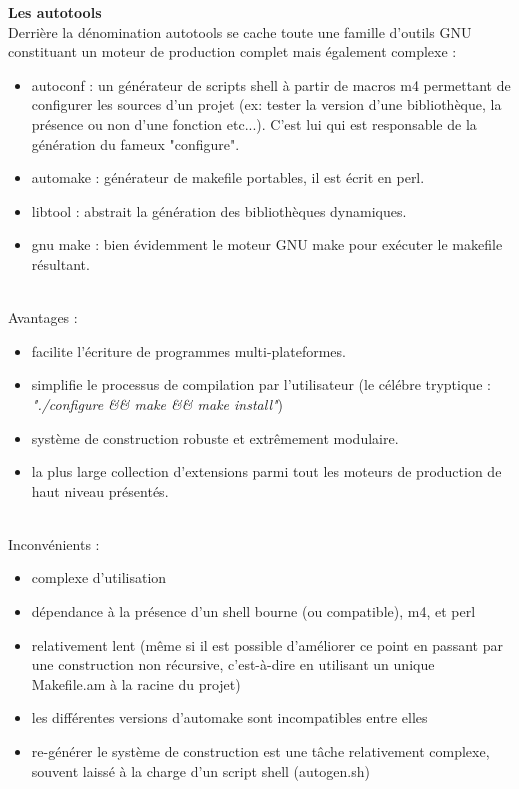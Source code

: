 \documentclass[11pt,twoside,a4paper]{article}
\begin{document}
\textbf{Les autotools}~\\

Derri{\`e}re la d{\'e}nomination autotools se cache toute une famille d'outils GNU constituant un moteur de production complet mais {\'e}galement complexe :
\begin{itemize}
	\item autoconf : un g{\'e}n{\'e}rateur de scripts shell {\`a} partir de macros m4 permettant de configurer les sources d'un projet (ex: tester la version d'une biblioth{\`e}que, la pr{\'e}sence ou non d'une fonction etc...). C'est lui qui est responsable de la g{\'e}n{\'e}ration du fameux "configure".
	\item automake : g{\'e}n{\'e}rateur de makefile portables, il est {\'e}crit en perl.
	\item libtool : abstrait la g{\'e}n{\'e}ration des biblioth{\`e}ques dynamiques.
	\item gnu make : bien {\'e}videmment le moteur GNU make pour ex{\'e}cuter le makefile r{\'e}sultant.
\end{itemize}~\\

Avantages :
\begin{itemize}
	\item facilite l'{\'e}criture de programmes multi-plateformes.
	\item simplifie le processus de compilation par l'utilisateur (le c{\'e}l{\'e}bre tryptique : \emph{"./configure \&\& make \&\& make install"})
	\item syst{\`e}me de construction robuste et extr{\^e}mement modulaire.
	\item la plus large collection d'extensions parmi tout les moteurs de production de haut niveau pr{\'e}sent{\'e}s.
\end{itemize}~\\

Inconv{\'e}nients :
\begin{itemize}
	\item complexe d'utilisation
	\item d{\'e}pendance {\`a} la pr{\'e}sence d'un shell bourne (ou compatible), m4, et perl
	\item relativement lent (m{\^e}me si il est possible d'am{\'e}liorer ce point en passant par une construction non r{\'e}cursive, c'est-{\`a}-dire en utilisant un unique Makefile.am {\`a} la racine du projet)
	\item les diff{\'e}rentes versions d'automake sont incompatibles entre elles
	\item re-g{\'e}n{\'e}rer le syst{\`e}me de construction est une t{\^a}che relativement complexe, souvent laiss{\'e} {\`a} la charge d'un script shell (autogen.sh)
\end{itemize}~\\
\end{document}
